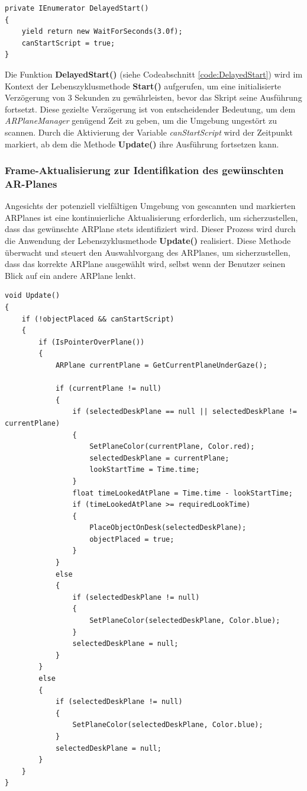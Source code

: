 \begin{lstlisting}[style=csharp, caption={Verzoegerter Start}, label=code:DelayedStart]
private IEnumerator DelayedStart()
{
    yield return new WaitForSeconds(3.0f);
    canStartScript = true;
}
\end{lstlisting}
Die Funktion \textbf{DelayedStart()} (siehe Codeabschnitt \ref{code:DelayedStart}) wird im Kontext der Lebenszyklusmethode
\textbf{Start()} aufgerufen, um eine initialisierte Verzögerung von 3 Sekunden zu gewährleisten, bevor das Skript seine
Ausführung fortsetzt. Diese gezielte Verzögerung ist von entscheidender Bedeutung, um dem \textit{ARPlaneManager} genügend
Zeit zu geben, um die Umgebung ungestört zu scannen. Durch die Aktivierung der Variable \textit{canStartScript} wird der
Zeitpunkt markiert, ab dem die Methode \textbf{Update()} ihre Ausführung fortsetzen kann.

\subsubsection{Frame-Aktualisierung zur Identifikation des gewünschten AR-Planes}
Angesichts der potenziell vielfältigen Umgebung von gescannten und markierten ARPlanes ist eine kontinuierliche Aktualisierung
erforderlich, um sicherzustellen, dass das gewünschte ARPlane stets identifiziert wird. Dieser Prozess wird durch die
Anwendung der Lebenszyklusmethode \textbf{Update()} realisiert. Diese Methode überwacht und steuert den Auswahlvorgang
des ARPlanes, um sicherzustellen, dass das korrekte ARPlane ausgewählt wird, selbst wenn der Benutzer seinen Blick auf
ein andere ARPlane lenkt.

\begin{lstlisting}[style=csharp, caption={Update Funktion}, label=code:Update]
void Update()
{
    if (!objectPlaced && canStartScript)
    {
        if (IsPointerOverPlane())
        {
            ARPlane currentPlane = GetCurrentPlaneUnderGaze();

            if (currentPlane != null)
            {
                if (selectedDeskPlane == null || selectedDeskPlane != currentPlane)
                {
                    SetPlaneColor(currentPlane, Color.red);
                    selectedDeskPlane = currentPlane;
                    lookStartTime = Time.time;
                }
                float timeLookedAtPlane = Time.time - lookStartTime;
                if (timeLookedAtPlane >= requiredLookTime)
                {
                    PlaceObjectOnDesk(selectedDeskPlane);
                    objectPlaced = true;
                }
            }
            else
            {
                if (selectedDeskPlane != null)
                {
                    SetPlaneColor(selectedDeskPlane, Color.blue);
                }
                selectedDeskPlane = null;
            }
        }
        else
        {
            if (selectedDeskPlane != null)
            {
                SetPlaneColor(selectedDeskPlane, Color.blue);
            }
            selectedDeskPlane = null;
        }
    }
}
\end{lstlisting}

